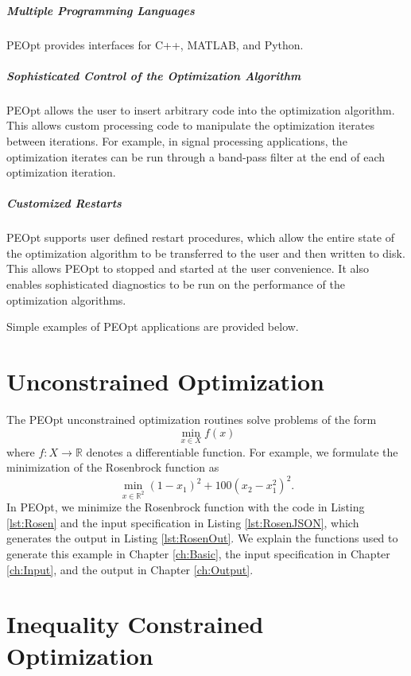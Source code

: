 \documentclass{report}
\newcommand{\re}{\mathbb{R}}
\begin{document}
\subparagraph{Multiple Programming Languages} PEOpt provides interfaces for C++, MATLAB, and Python.

\subparagraph{Sophisticated Control of the Optimization Algorithm} PEOpt allows the user to insert arbitrary code into the optimization algorithm.  This allows  custom processing code to manipulate the optimization iterates between iterations.  For example, in signal processing applications, the optimization iterates can be run through a band-pass filter at the end of each optimization iteration.

\subparagraph{Customized Restarts} PEOpt supports user defined restart procedures, which allow the entire state of the optimization algorithm to be transferred to the user and then written to disk.  This allows PEOpt to stopped and started at the user convenience.  It also enables sophisticated diagnostics to be run on the performance of the optimization algorithms.

        Simple examples of PEOpt applications are provided below.

\section{Unconstrained Optimization}

        The PEOpt unconstrained optimization routines solve problems of the form
$$
        \min_{x\in X} f(x)
$$
where $f:X\rightarrow \re$ denotes a differentiable function.  For example, we formulate the minimization of the Rosenbrock function as
$$
        \min_{x\in\re^2} (1-x_1)^2+100(x_2-x_1^2)^2.
$$
In PEOpt, we minimize the Rosenbrock function with the code in Listing \ref{lst:Rosen} and the input specification in Listing \ref{lst:RosenJSON}, which generates the output in Listing \ref{lst:RosenOut}.  We explain the functions used to generate this example in Chapter \ref{ch:Basic}, the input specification in Chapter \ref{ch:Input}, and the output in Chapter \ref{ch:Output}.





\section{Inequality Constrained Optimization}
\end{document}
